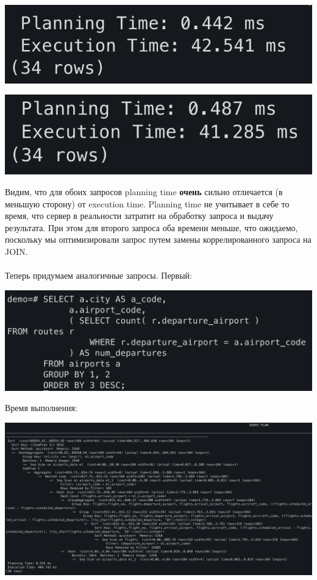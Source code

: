 \documentclass[a4paper,12pt]{article}
\begin{document}
\begin{center}
\includegraphics[scale=0.6]{85.png}
\end{center}
\begin{center}
\includegraphics[scale=0.6]{86.png}
\end{center}
Видим, что для обоих запросов planning time \textbf{очень} сильно отличается (в меньшую сторону) от execution time. Planning time не учитывает в себе то время, что сервер в реальности затратит на обработку запроса и выдачу результата. При этом для второго запроса оба времени меньше, что ожидаемо, поскольку мы оптимизировали запрос путем замены коррелированного запроса на JOIN. 
\\\\
Теперь придумаем аналогичные запросы. Первый:
\begin{center}
\includegraphics[scale=0.6]{87.png}
\end{center}
Время выполнения:
\begin{center}
\includegraphics[scale=0.3]{88.png}
\end{center}
\end{document}
